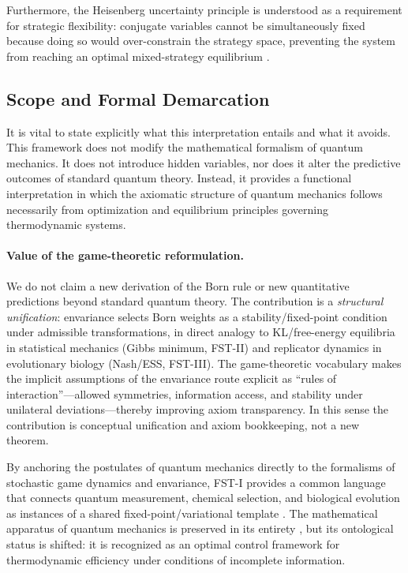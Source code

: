 \documentclass[12pt,a4paper]{article}
\theoremstyle{remark}
\begin{document}
Furthermore, the Heisenberg uncertainty principle is understood as a requirement for strategic flexibility: conjugate variables cannot be simultaneously fixed because doing so would over-constrain the strategy space, preventing the system from reaching an optimal mixed-strategy equilibrium \citep{HeisenbergCovariant}.

\subsection{Scope and Formal Demarcation}

It is vital to state explicitly what this interpretation entails and what it avoids. This framework does not modify the mathematical formalism of quantum mechanics. It does not introduce hidden variables, nor does it alter the predictive outcomes of standard quantum theory. Instead, it provides a functional interpretation in which the axiomatic structure of quantum mechanics follows necessarily from optimization and equilibrium principles governing thermodynamic systems.

\paragraph{Value of the game-theoretic reformulation.}
We do not claim a new derivation of the Born rule or new quantitative predictions beyond standard quantum theory. The contribution is a \emph{structural unification}: envariance selects Born weights as a stability/fixed-point condition under admissible transformations, in direct analogy to KL/free-energy equilibria in statistical mechanics (Gibbs minimum, FST-II) and replicator dynamics in evolutionary biology (Nash/ESS, FST-III). The game-theoretic vocabulary makes the implicit assumptions of the envariance route explicit as ``rules of interaction''---allowed symmetries, information access, and stability under unilateral deviations---thereby improving axiom transparency. In this sense the contribution is conceptual unification and axiom bookkeeping, not a new theorem.

By anchoring the postulates of quantum mechanics directly to the formalisms of stochastic game dynamics and envariance, FST-I provides a common language that connects quantum measurement, chemical selection, and biological evolution as instances of a shared fixed-point/variational template \citep{ZurekDerivation2003}. The mathematical apparatus of quantum mechanics is preserved in its entirety \citep{QuantumOptimization}, but its ontological status is shifted: it is recognized as an optimal control framework for thermodynamic efficiency under conditions of incomplete information.
\end{document}
